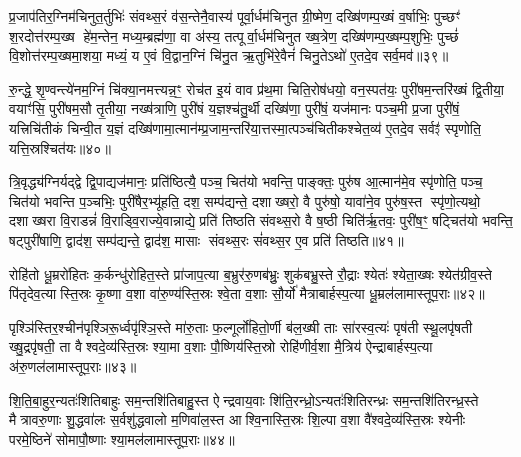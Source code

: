 {\anuvakamend[{षो॒ढा॒वि॒हि॒तो वै वैष्ण॒वीर॒न्यो विꣳ॑श॒तिश्च॑॥९॥}]}

प्र॒जाप॑तिर॒ग्निम॑चिनुत॒र्तुभिः॑ संवथ्स॒रं व॑स॒न्तेनै॒वास्य॑ पूर्वा॒र्धम॑चिनुत ग्री॒ष्मेण॒ दख्षि॑णम्प॒ख्षं व॒र्\mbox{}षाभिः॒ पुच्छꣳ॑ श॒रदोत्त॑रम्प॒ख्ष हे॑म॒न्तेन॒ मध्य॒म्ब्रह्म॑णा॒ वा अ॑स्य॒ तत्पूर्वा॒र्धम॑चिनुत ख्ष॒त्रेण॒ दख्षि॑णम्प॒ख्षम्प॒शुभिः॒ पुच्छं॑ वि॒शोत्त॑रम्प॒ख्षमा॒शया॒ मध्यं॒ य ए॒वं वि॒द्वान॒ग्निं चि॑नु॒त ऋ॒तुभि॑रे॒वैनं॑ चिनु॒तेऽथो॑ ए॒तदे॒व सर्व॒मव॑॥३९॥

रु॒न्द्धे॒ शृ॒ण्वन्त्ये॑नम॒ग्निं चि॑क्या॒नमत्त्यन्न॒ꣳ॒ रोच॑त इ॒यं वाव प्र॑थ॒मा चिति॒रोष॑धयो॒ वन॒स्पत॑यः॒ पुरी॑षम॒न्तरि॑ख्षं द्वि॒तीया॒ वयाꣳ॑सि॒ पुरी॑षम॒सौ तृ॒तीया॒ नख्ष॑त्राणि॒ पुरी॑षं य॒ज्ञश्च॑तु॒र्थी दख्षि॑णा॒ पुरी॑षं॒ यज॑मानः पञ्च॒मी प्र॒जा पुरी॑षं॒ यत्त्रिचि॑तीकं चिन्वी॒त य॒ज्ञं दख्षि॑णामा॒त्मान॑म्प्र॒जाम॒न्तरि॑या॒त्तस्मा॒त्पञ्च॑चितीकश्चेत॒व्य॑ ए॒तदे॒व सर्वꣵ॑ स्पृणोति॒ यत्ति॒स्रश्चित॑यः॥४०॥

त्रि॒वृद्ध्य॑ग्निर्यद्द्वे द्वि॒पाद्यज॑मानः॒ प्रति॑ष्ठित्यै॒ पञ्च॒ चित॑यो भवन्ति॒ पाङ्क्तः॒ पुरु॑ष आ॒त्मान॑मे॒व स्पृ॑णोति॒ पञ्च॒ चित॑यो भवन्ति प॒ञ्चभिः॒ पुरी॑षैर॒भ्यू॑हति॒ दश॒ सम्प॑द्यन्ते॒ दशाख्षरो॒ वै पुरु॑षो॒ यावा॑ने॒व पुरु॑ष॒स्त स्पृ॑णो॒त्यथो॒ दशाख्षरा वि॒राडन्नं॑ वि॒राड्वि॒राज्ये॒वान्नाद्ये॒ प्रति॑ तिष्ठति संवथ्स॒रो वै ष॒ष्ठी चिति॑र्\mbox{}ऋ॒तवः॒ पुरी॑ष॒ꣳ॒ षट्चित॑यो भवन्ति॒ षट्पुरी॑षाणि॒ द्वाद॑श॒ सम्प॑द्यन्ते॒ द्वाद॑श॒ मासाः संवथ्स॒रः सं॑वथ्स॒र ए॒व प्रति॑ तिष्ठति॥४१॥

{\anuvakamend[{अव॒ चित॑यः॒ पुरी॑षं॒ पञ्च॑दश च॥10॥}]}

रोहि॑तो धू॒म्ररो॑हितः क॒र्कन्धु॑रोहित॒स्ते प्रा॑जाप॒त्या ब॒भ्रुर॑रु॒णब॑भ्रुः॒ शुक॑बभ्रु॒स्ते रौ॒द्राः श्येतः॑ श्येता॒ख्षः श्येत॑ग्रीव॒स्ते पि॑तृदेव॒त्यास्ति॒स्रः कृ॒ष्णा व॒शा वा॑रु॒ण्य॑स्ति॒स्रः श्वे॒ता व॒शाः सौ॒र्यो॑ मैत्राबार्\mbox{}हस्प॒त्या धू॒म्रल॑लामास्तूप॒राः॥४२॥

{\anuvakamend[{॥11॥}]}

पृश्ञि॑स्तिर॒श्चीन॑पृश्ञिरू॒र्ध्वपृ॑श्ञि॒स्ते मा॑रु॒ताः फ॒ल्गूर्लो॑हितो॒र्णी ब॑ल॒ख्षी ताः सा॑रस्व॒त्यः॑ पृष॑ती स्थू॒लपृ॑षती ख्षु॒द्रपृ॑षती॒ ता वैश्वदे॒व्य॑स्ति॒स्रः श्या॒मा व॒शाः पौ॒ष्णिय॑स्ति॒स्रो रोहि॑णीर्व॒शा मै॒त्रिय॑ ऐन्द्राबार्\mbox{}हस्प॒त्या अ॑रु॒णल॑लामास्तूप॒राः॥४३॥

{\anuvakamend[{रोहि॑तः॒ पृश्ञि॒ष्षड्विꣳ॑शति॒ष्षड्विꣳ॑शतिः॥12॥}]}

शि॒ति॒बा॒हुर॒न्यतः॑शितिबाहुः सम॒न्तशि॑तिबाहु॒स्त ऐन्द्रवाय॒वाः शि॑ति॒रन्ध्रो॒ऽन्यतः॑शितिरन्ध्रः सम॒न्तशि॑तिरन्ध्र॒स्ते मैत्रावरु॒णाः शु॒द्धवा॑लः स॒र्वशु॑द्धवालो म॒णिवा॑ल॒स्त आश्वि॒नास्ति॒स्रः शि॒ल्पा व॒शा वै॑श्वदे॒व्य॑स्ति॒स्रः श्येनीः परमे॒ष्ठिने॑ सोमापौ॒ष्णाः श्या॒मल॑लामास्तूप॒राः॥४४॥

